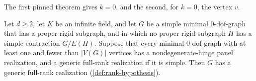 \begin{fmlnote}
  The first pinned theorem gives $k = 0$, and the second, for $k = 0$,
  the vertex $v$.
\end{fmlnote}

\begin{lemma}
  \label{lem:case-I-realization-h65}
  \leanok
  Let $d \ge 2$, let $K$ be an infinite field, and let $G$ be a simple
  minimal $0$-dof-graph that has a proper rigid subgraph, and in which
  no proper rigid subgraph $H$ has a simple contraction $G/E(H)$.
  Suppose that every minimal $0$-dof-graph with at least one and fewer
  than $|V(G)|$ vertices has a nondegenerate-hinge panel realization,
  and a generic full-rank realization if it is simple. Then $G$ has a
  generic full-rank realization (\cref{def:rank-hypothesis}).
\end{lemma}

